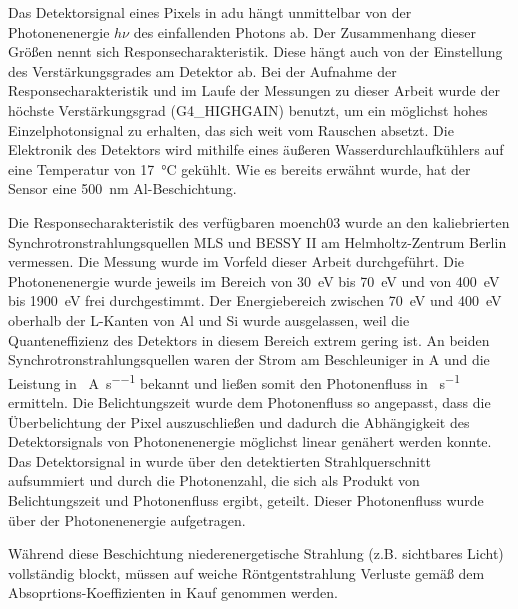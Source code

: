 \noindent
Das Detektorsignal eines Pixels in \gls{adu} hängt unmittelbar von der Photonenenergie $h\nu$ des einfallenden Photons ab. Der Zusammenhang dieser Größen nennt sich Responsecharakteristik. Diese hängt auch von der Einstellung des Verstärkungsgrades am Detektor ab. Bei der Aufnahme der Responsecharakteristik und im Laufe der Messungen zu dieser Arbeit wurde der höchste Verstärkungsgrad (G4\_HIGHGAIN) benutzt, um ein möglichst hohes Einzelphotonsignal zu erhalten, das sich weit vom Rauschen absetzt. Die Elektronik des Detektors wird mithilfe eines äußeren Wasserdurchlaufkühlers auf eine Temperatur von \SI{17}{\celsius} gekühlt. Wie es bereits erwähnt wurde, hat der Sensor eine \SI{500}{\nano\meter} Al-Beschichtung.
%     

\noindent
Die Responsecharakteristik des verfügbaren \gls{moench03} wurde an den kaliebrierten Synchrotronstrahlungsquellen MLS und BESSY II am Helmholtz-Zentrum Berlin vermessen. Die Messung wurde im Vorfeld dieser Arbeit durchgeführt. Die Photonenenergie wurde jeweils im Bereich von \SI{30}{\eV} bis \SI{70}{\eV} und von \SI{400}{\eV} bis \SI{1900}{\eV} frei durchgestimmt. Der Energiebereich zwischen \SI{70}{\eV} und \SI{400}{\eV} oberhalb der L-Kanten von Al und Si wurde ausgelassen, weil die Quanteneffizienz des Detektors in diesem Bereich extrem gering ist. An beiden Synchrotronstrahlungsquellen waren der Strom am Beschleuniger in \si{\ampere} und die Leistung in \si{\photons\per\ampere\per\second} bekannt und ließen somit den Photonenfluss in \si{\photons\per\second} ermitteln. Die Belichtungszeit wurde dem Photonenfluss so angepasst, dass die Überbelichtung der Pixel auszuschließen und dadurch die Abhängigkeit des Detektorsignals von Photonenenergie möglichst linear genähert werden konnte. Das Detektorsignal in \si{\adu} wurde über den detektierten Strahlquerschnitt aufsummiert und durch die Photonenzahl, die sich als Produkt von Belichtungszeit und Photonenfluss ergibt, geteilt. Dieser Photonenfluss wurde über der Photonenenergie aufgetragen.

\noindent
Während diese Beschichtung niederenergetische Strahlung (z.B. sichtbares Licht) vollständig blockt, müssen auf weiche Röntgentstrahlung Verluste gemäß dem Absoprtions-Koeffizienten in Kauf genommen werden.

